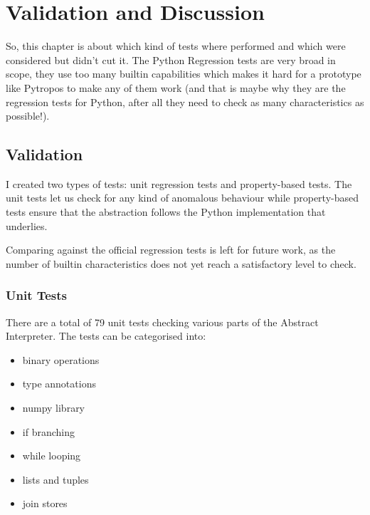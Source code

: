\chapter{Validation and Discussion}\label{validation-and-discussion}

{}

So, this chapter is about which kind of tests where performed and which
were considered but didn't cut it. The Python Regression tests are very
broad in scope, they use too many builtin capabilities which makes it
hard for a prototype like Pytropos to make any of them work (and that is
maybe why they are the regression tests for Python, after all they need
to check as many characteristics as possible!).

\section{Validation}\label{validation}

{}

I created two types of tests: unit regression tests and property-based
tests. The unit tests let us check for any kind of anomalous behaviour
while property-based tests ensure that the abstraction follows the
Python implementation that underlies.

Comparing against the official regression tests is left for future work,
as the number of builtin characteristics does not yet reach a
satisfactory level to check.

\subsection{Unit Tests}\label{unit-tests}

There are a total of 79 unit tests checking various parts of the
Abstract Interpreter. The tests can be categorised into:

\begin{itemize}
\tightlist
\item
  binary operations
\item
  type annotations
\item
  numpy library
\item
  if branching
\item
  while looping
\item
  lists and tuples
\item
  join stores
\end{itemize}

